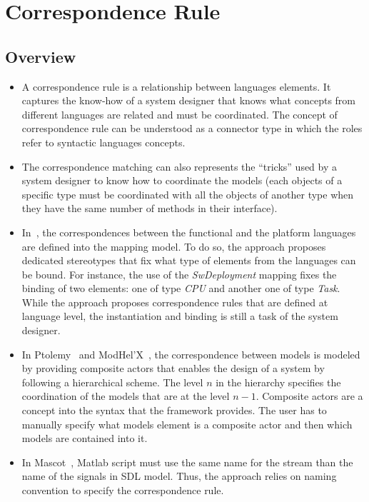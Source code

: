 \section{Correspondence Rule}
	\subsection{Overview}
	\begin{itemize}
	\item A correspondence rule is a relationship between languages elements. It captures the know-how of a system designer that knows what concepts from different languages are related and must be coordinated. The concept of correspondence rule can be understood as a connector type in which the roles refer to syntactic languages concepts.  
	
	\item The correspondence matching can also represents the ``tricks'' used by a system designer to know how to coordinate the models (\eg each objects of a specific type must be coordinated with all the objects of another type when they have the same number of methods in their interface). 
				
	\item In~\cite{dinatale}, the correspondences between the functional and the platform languages are defined into the mapping model. To do so, the approach proposes dedicated stereotypes that fix what type of elements from the languages can be bound. For instance, the use of the \emph{SwDeployment} mapping fixes the binding of two elements: one of type \emph{CPU} and another one of type \emph{Task}. While the approach proposes correspondence rules that are defined at language level, the instantiation and binding is still a task of the system designer. 		

	\item In Ptolemy~\cite{ptoleframebib} and ModHel'X~\cite{modhelxbib}, the correspondence between models is modeled by providing composite actors that enables the design of a system by following a hierarchical scheme. The level $n$ in the hierarchy specifies the coordination of the models that are at the level $n-1$. Composite actors are a concept into the syntax that the framework provides. The user has to manually specify what models element is a composite actor and then which models are contained into it. 
			
	\item In Mascot~\cite{mascotbib}, Matlab script must use the same name for the stream than the name of the signals in SDL model. Thus, the approach relies on naming convention to specify the correspondence rule. 
		
		\end{itemize}
		
